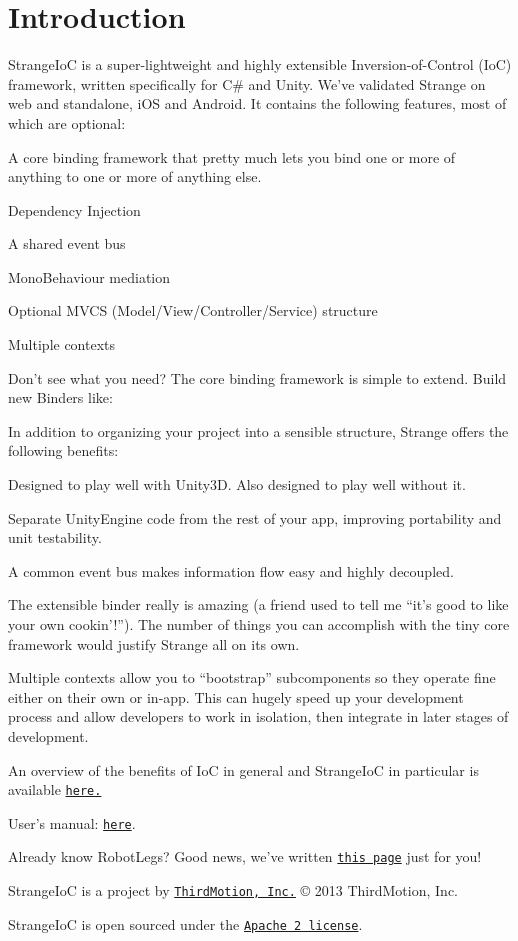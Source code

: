 \hypertarget{index_intro_sec}{}\section{Introduction}\label{index_intro_sec}
Strange\-Io\-C is a super-\/lightweight and highly extensible Inversion-\/of-\/\-Control (Io\-C) framework, written specifically for C\# and Unity. We’ve validated Strange on web and standalone, i\-O\-S and Android. It contains the following features, most of which are optional\-: 
\begin{DoxyItemize}
\item A core binding framework that pretty much lets you bind one or more of anything to one or more of anything else. 
\item Dependency Injection 
\item A shared event bus 
\item Mono\-Behaviour mediation 
\item Optional M\-V\-C\-S (Model/\-View/\-Controller/\-Service) structure 
\item Multiple contexts 
\item Don’t see what you need? The core binding framework is simple to extend. Build new Binders like\-: 
\end{DoxyItemize}In addition to organizing your project into a sensible structure, Strange offers the following benefits\-: 
\begin{DoxyItemize}
\item Designed to play well with Unity3\-D. Also designed to play well without it. 
\item Separate Unity\-Engine code from the rest of your app, improving portability and unit testability. 
\item A common event bus makes information flow easy and highly decoupled. 
\item The extensible binder really is amazing (a friend used to tell me “it’s good to like your own cookin’!”). The number of things you can accomplish with the tiny core framework would justify Strange all on its own. 
\item Multiple contexts allow you to “bootstrap” subcomponents so they operate fine either on their own or in-\/app. This can hugely speed up your development process and allow developers to work in isolation, then integrate in later stages of development. 
\end{DoxyItemize}An overview of the benefits of Io\-C in general and Strange\-Io\-C in particular is available \href{../../exec.html}{\tt here.} \par
 User's manual\-: \href{../../TheBigStrangeHowTo.html}{\tt here}. \par
 Already know Robot\-Legs? Good news, we've written \href{../../rl.html}{\tt this page} just for you!

Strange\-Io\-C is a project by \href{http://thirdmotion.com/}{\tt Third\-Motion, Inc.} \copyright{} 2013 Third\-Motion, Inc.

Strange\-Io\-C is open sourced under the \href{http://www.apache.org/licenses/LICENSE-2.0.html}{\tt Apache 2 license}. 